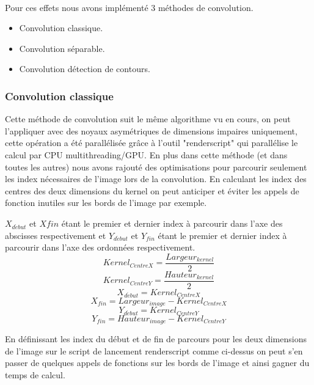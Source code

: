     \\

    Pour ces effets nous avons implémenté 3 méthodes de convolution.


    \begin{itemize}
        \item Convolution classique.
        \item Convolution séparable.
        \item Convolution détection de contours.
    \end{itemize}
    

    \subsubsection*{Convolution classique}
    
        Cette méthode de convolution suit le même algorithme vu en cours, on peut l'appliquer avec des noyaux asymétriques de dimensions impaires uniquement,
        cette opération a été parallélisée grâce à l'outil "renderscript" qui parallélise le calcul par CPU multithreading/GPU. En plus dans cette méthode (et dans toutes les autres) nous avons rajouté
        des optimisations pour parcourir seulement les index nécessaires de l'image lors de la convolution. En calculant les index des centres des deux dimensions du kernel
        on peut anticiper et éviter les appels de fonction inutiles sur les bords de l'image par exemple.
        
        $X_{d\acute{e}but}$ et $X{fin}$ étant le premier et dernier index à parcourir dans l'axe des abscisses respectivement et
        $Y_{d\acute{e}but}$ et $Y_{fin}$ étant le premier et dernier index à parcourir dans l'axe des ordonnées respectivement.
        \[
            Kernel_{CentreX} =   \frac{Largeur_{kernel}}{2}            
        \]
        \[
            Kernel_{CentreY} =   \frac{Hauteur_{kernel}}{2}            
        \]
        \[
            X_{d\acute{e}but} = Kernel_{CentreX}      
        \]
        \[
            X_{fin} = Largeur_{image} - Kernel_{CentreX}           
        \]
        \[
            Y_{d\acute{e}but} = Kernel_{CentreY}      
        \]
        \[
            Y_{fin} = Hauteur_{image} - Kernel_{CentreY}           
        \]

        En définissant les index du début et de fin de parcours pour les deux dimensions de l'image sur le script de lancement renderscript
        comme ci-dessus on peut s'en passer de quelques appels de fonctions sur les bords de l'image et ainsi gagner du temps de calcul.

